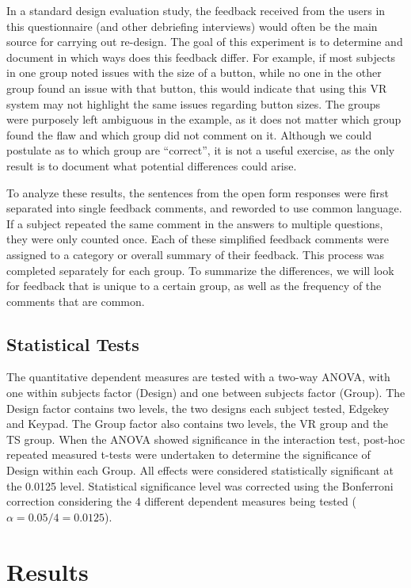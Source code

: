 In a standard design evaluation study, the feedback received from the users in this questionnaire (and other debriefing interviews) would often be the main source for carrying out re-design.
The goal of this experiment is to determine and document in which ways does this feedback differ.
For example, if most subjects in one group noted issues with the size of a button, while no one in the other group found an issue with that button, this would indicate that using this VR system may not highlight the same issues regarding button sizes.
The groups were purposely left ambiguous in the example, as it does not matter which group found the flaw and which group did not comment on it.
Although we could postulate as to which group are ``correct'', it is not a useful exercise, as the only result is to document what potential differences could arise.

To analyze these results, the sentences from the open form responses were first separated into single feedback comments, and reworded to use common language.
If a subject repeated the same comment in the answers to multiple questions, they were only counted once.
Each of these simplified feedback comments were assigned to a category or overall summary of their feedback.
This process was completed separately for each group.
To summarize the differences, we will look for feedback that is unique to a certain group, as well as the frequency of the comments that are common.

\subsection{Statistical Tests}

The quantitative dependent measures are tested with a two-way ANOVA, with one within subjects factor (Design) and one between subjects factor (Group).
The Design factor contains two levels, the two designs each subject tested, Edgekey and Keypad.
The Group factor also contains two levels, the VR group and the TS group.
When the ANOVA showed significance in the interaction test, post-hoc repeated measured t-tests were undertaken to determine the significance of Design within each Group.
All effects were considered statistically significant at the 0.0125 level.
Statistical significance level was corrected using the Bonferroni correction considering the 4 different dependent measures being tested ($\alpha = 0.05/4 = 0.0125$).

\section{Results}

